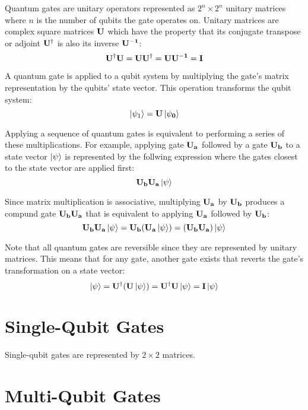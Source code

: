 Quantum gates are unitary operators represented as $2^n \times 2^n$ unitary matrices where $n$ is the number of qubits the gate operates on. Unitary matrices are complex square matrices $\bf{U}$ which have the property that its conjugate transpose or adjoint $\bf{U^{\dagger}}$ is also its inverse $\bf{U^{-1}}$:
$$\bf{U^{\dagger}U}=\bf{UU^{\dagger}}=\bf{UU^{-1}}=I$$

A quantum gate is applied to a qubit system by multiplying the gate's matrix representation by the qubits' state vector. This operation transforms the qubit system:
$$\left|{\psi_1}\right\rangle=\bf{U}\left|{\psi_0}\right\rangle$$

Applying a sequence of quantum gates is equivalent to performing a series of these multiplications. For example, applying gate $\bf{U_a}$ followed by a gate $\bf{U_b}$ to a state vector $\left|{\psi}\right\rangle$ is represented by the follwing expression where the gates closest to the state vector are applied first:
$$\bf{U_b}\bf{U_a}\left|{\psi}\right\rangle$$

Since matrix multiplication is associative, multiplying $\bf{U_a}$ by $\bf{U_b}$ produces a compund gate $\bf{U_{b}U_{a}}$ that is equivalent to applying $\bf{U_a}$ followed by $\bf{U_b}$:
$$\bf{U_b}\bf{U_a}\left|{\psi}\right\rangle=\bf{U_b}(\bf{U_a}\left|{\psi}\right\rangle)=(\bf{U_b}\bf{U_a})\left|{\psi}\right\rangle$$

Note that all quantum gates are reversible since they are represented by unitary matrices. This means that for any gate, another gate exists that reverts the gate's transformation on a state vector:
$$\left|{\psi}\right\rangle=\bf{U^{\dagger}}(\bf{U}\left|{\psi}\right\rangle)=\bf{U^{\dagger}}\bf{U}\left|{\psi}\right\rangle=\bf{I}\left|{\psi}\right\rangle$$


\section{Single-Qubit Gates}

Single-qubit gates are represented by $2 \times 2$ matrices.


\section{Multi-Qubit Gates}

